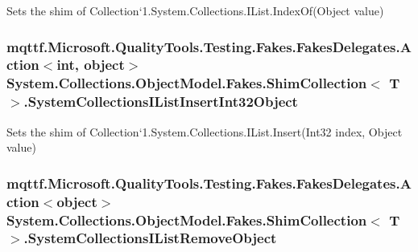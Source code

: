 Sets the shim of Collection`1.System.\-Collections.\-I\-List.\-Index\-Of(\-Object value)

\hypertarget{class_system_1_1_collections_1_1_object_model_1_1_fakes_1_1_shim_collection_3_01_t_01_4_aed894347d4bcaeaa9f35a979053907f8}{
\subsubsection[{System\-Collections\-I\-List\-Insert\-Int32\-Object}]{\setlength{\rightskip}{0pt plus 5cm}mqttf.\-Microsoft.\-Quality\-Tools.\-Testing.\-Fakes.\-Fakes\-Delegates.\-Action$<$int, object$>$ System.\-Collections.\-Object\-Model.\-Fakes.\-Shim\-Collection$<$ T $>$.System\-Collections\-I\-List\-Insert\-Int32\-Object\hspace{0.3cm}{\ttfamily [set]}}}\label{class_system_1_1_collections_1_1_object_model_1_1_fakes_1_1_shim_collection_3_01_t_01_4_aed894347d4bcaeaa9f35a979053907f8}


Sets the shim of Collection`1.System.\-Collections.\-I\-List.\-Insert(\-Int32 index, Object value)

\hypertarget{class_system_1_1_collections_1_1_object_model_1_1_fakes_1_1_shim_collection_3_01_t_01_4_ae91d4fa37a273049679773113e46bcfa}{
\subsubsection[{System\-Collections\-I\-List\-Remove\-Object}]{\setlength{\rightskip}{0pt plus 5cm}mqttf.\-Microsoft.\-Quality\-Tools.\-Testing.\-Fakes.\-Fakes\-Delegates.\-Action$<$object$>$ System.\-Collections.\-Object\-Model.\-Fakes.\-Shim\-Collection$<$ T $>$.System\-Collections\-I\-List\-Remove\-Object\hspace{0.3cm}{\ttfamily [set]}}}\label{class_system_1_1_collections_1_1_object_model_1_1_fakes_1_1_shim_collection_3_01_t_01_4_ae91d4fa37a273049679773113e46bcfa}


